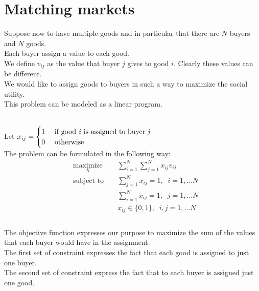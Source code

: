 \documentclass{article}
\begin{document}
\section{Matching markets} Suppose now to have multiple goods and in particular that there are $N$ buyers and $N$ goods.\\
Each buyer assign a value to each good.\\
We define $v_{ij}$ as the value that buyer $j$ gives to good $i$. Clearly these values can be different.\\
We would like to assign goods to buyers in such a way to maximize the social utility.\\
This problem can be modeled as a linear program.

\mbox{}\\

Let $x_{ij}= 
\begin{cases}
	1 \hfill & \text{ if good \textit{i} is assigned to buyer \textit{j}} \\
	0 \hfill &\text{ otherwise}\\
\end{cases}
\\
$ \mbox{}\\
The problem can be formulated in the following way:
\begin{equation*}
%
\begin{aligned}
& \underset{X}{\textrm{maximize} }
& & \sum_{i=1}^{N}\sum_{j=1}^{N} x_{ij}v_{ij}\\
& \textrm{subject to } 
	&& \sum_{j=1}^N x_{ij}=1, \;\; i=1, \dots N \\
	&&& \sum_{i=1}^N x_{ij}=1, \;\; j=1, \dots N \\	
	&&& x_{ij} \in \{0,1\},  \;\; i,j=1, \dots N \\
\end{aligned}
\end{equation*}
\mbox{}\\
The objective function expresses our purpose to maximize the sum of the values that each buyer would have in the assignment.\\
The first set of constraint expresses the fact that each good is assigned to just one buyer.\\
The second set of constraint express the fact that to each buyer is assigned just one good.
\end{document}

